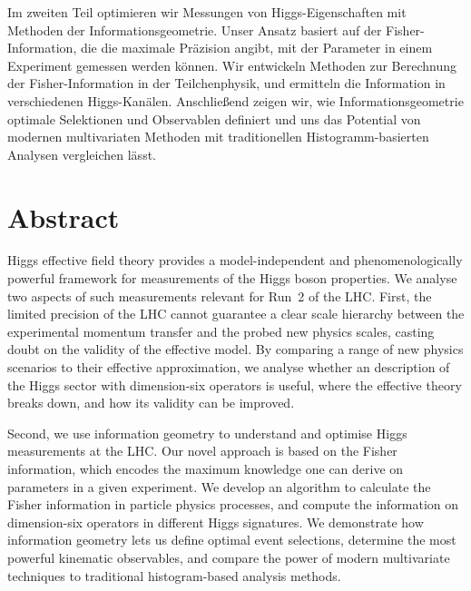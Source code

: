 Im zweiten Teil optimieren wir Messungen von Higgs-Eigenschaften mit
Methoden der Informationsgeometrie. Unser Ansatz basiert auf der
Fisher-Information, die die maximale Pr\"azision angibt, mit der
Parameter in einem Experiment gemessen werden k\"onnen. Wir entwickeln
Methoden zur Berechnung der Fisher-Information in der Teilchenphysik,
und ermitteln die Information in verschiedenen
Higgs-Kan\"alen. Anschlie\ss{}end zeigen wir, wie
Informationsgeometrie optimale Selektionen und Observablen definiert
und uns das Potential von modernen multivariaten Methoden mit
traditionellen Histogramm-basierten Analysen vergleichen l\"asst.



\chapter*{Abstract}


Higgs effective field theory provides a model-independent and
phenomenologically powerful framework for measurements of the Higgs
boson properties. We analyse two aspects of such measurements relevant
for Run~2 of the LHC. First, the limited precision of the LHC cannot
guarantee a clear scale hierarchy between the experimental momentum
transfer and the probed new physics scales, casting doubt on the
validity of the effective model. By comparing a range of new physics
scenarios to their effective approximation, we analyse whether an
description of the Higgs sector with dimension-six operators is
useful, where the effective theory breaks down, and how its validity
can be improved.

Second, we use information geometry to understand and optimise Higgs
measurements at the LHC. Our novel approach is based on the Fisher
information, which encodes the maximum knowledge one can derive on
parameters in a given experiment. We develop an algorithm to calculate
the Fisher information in particle physics processes, and compute the
information on dimension-six operators in different Higgs signatures.
We demonstrate how information geometry lets us define optimal event
selections, determine the most powerful kinematic observables, and
compare the power of modern multivariate techniques to traditional
histogram-based analysis methods.
